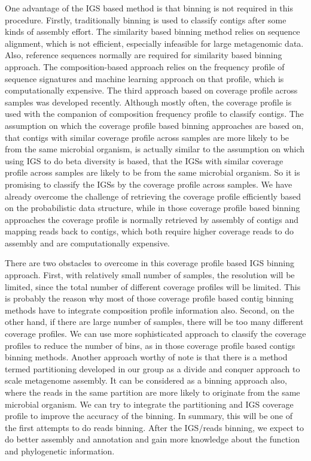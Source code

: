 One advantage of the IGS based method is that binning is not required in this
procedure. Firstly, traditionally binning is used to classify contigs after some
kinds of assembly effort. The similarity based binning method relies on
sequence alignment, which is not efficient, especially infeasible for large
metagenomic data. Also, reference sequences normally are required for
similarity based binning approach. The composition-based approach relies on the
frequency profile of sequence signatures and machine learning approach on that
profile, which is computationally expensive. 
The third approach based on coverage profile across samples was developed
recently.\cite{Imelfort2014}\cite{Alneberg2014} Although mostly often, the coverage
profile is used with the companion of composition frequency profile to classify
contigs. The assumption on which the coverage profile based binning approaches
are based on, that contigs with similar coverage profile across samples are
more likely to be from the same microbial organism, is actually similar to the
assumption on which using IGS to do beta diversity is based, that the IGSs with
similar coverage profile across samples are likely to be from the same
microbial organism. So it is promising to classify the IGSs by the coverage
profile across samples. We have already overcome the challenge of retrieving the
coverage profile efficiently based on the probabilistic data structure, while
in those coverage profile based binning approaches the coverage profile is 
normally retrieved by assembly of contigs and mapping
reads back to contigs, which both require higher coverage reads to do assembly
and are computationally expensive. 

There are two obstacles to overcome in this coverage profile based
IGS binning approach. First, with relatively small number of samples, the
resolution will be limited, since the total number of different coverage
profiles will be limited. This is probably the reason why most of those coverage
profile based contig binning methods have to integrate composition profile information
also. Second, on the other hand, if there are large number of samples, there
will be too many different coverage profiles. We can use more sophisticated
 approach to classify the coverage profiles to reduce the number of bins,
as in those coverage profile based contigs binning methods. Another approach
worthy of note is that there is a method termed partitioning developed in
our group as a divide and conquer approach to scale metagenome assembly. It can be 
considered as a binning approach also, where the reads in the same
partition are more likely to originate from the same microbial organism. We can
try to integrate the partitioning and IGS coverage profile to improve the
accuracy of the binning. In summary, this will be one of the first attempts to
do reads binning. After the IGS/reads binning,  we expect to do better assembly
 and annotation and gain more knowledge about the
function and phylogenetic information.  

